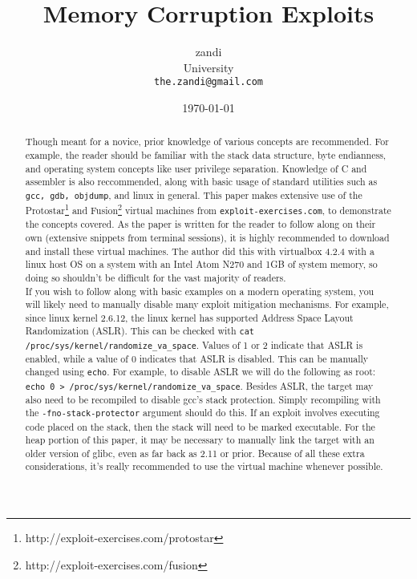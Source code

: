 \documentclass[a4paper]{article}
\begin{document}
\title{Memory Corruption Exploits}
\author{zandi\\
	University\\
	\texttt{the.zandi@gmail.com}}
\date{\today}
\maketitle

\begin{abstract}
Though meant for a novice, prior knowledge of various concepts are recommended. For example,
the reader should be familiar with the stack data structure, byte endianness, and operating system
concepts like user privilege separation. Knowledge of C and assembler is also reccommended, along
with basic usage of standard utilities such as \texttt{gcc, gdb, objdump}, and linux in general.
This paper makes extensive use of the Protostar\footnote{http://exploit-exercises.com/protostar} and 
Fusion\footnote{http://exploit-exercises.com/fusion} virtual machines from \texttt{exploit-exercises.com},
to demonstrate the concepts covered. As the paper is written for the reader to follow along on their
own (extensive snippets from terminal sessions), it is highly recommended to download and install these
virtual machines. The author did this with virtualbox 4.2.4 with a linux host OS on a system with
an Intel Atom N270 and 1GB of system memory, so doing so shouldn't be difficult for the vast majority
of readers.\\

If you wish to follow along with basic examples on a modern operating system, you will likely
need to manually disable many exploit mitigation mechanisms. For example, since linux kernel
2.6.12, the linux kernel has supported Address Space Layout Randomization (ASLR). This can be
checked with \texttt{cat /proc/sys/kernel/randomize\_va\_space}. Values of 1 or 2 indicate that
ASLR is enabled, while a value of 0 indicates that ASLR is disabled. This can be manually
changed using \texttt{echo}. For example, to disable ASLR we will do the following as root:
\texttt{echo 0 > /proc/sys/kernel/randomize\_va\_space}. Besides ASLR, the target may also need to
be recompiled to disable gcc's stack protection. Simply recompiling with the \texttt{-fno-stack-protector}
argument should do this. If an exploit involves executing code placed on the stack, then
the stack will need to be marked executable. For the heap portion of this paper, it may
be necessary to manually link the target with an older version of glibc, even as far back as
2.11 or prior. Because of all these extra considerations, it's really recommended to use the virtual
machine whenever possible.\\


\end{abstract}
\end{document}
